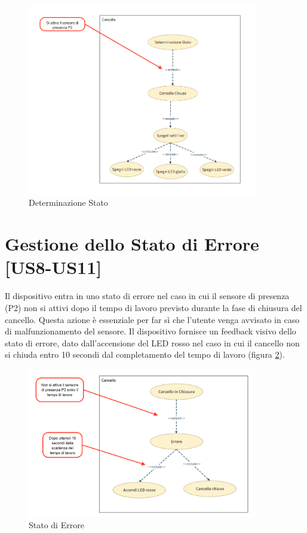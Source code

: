 \begin{figure}[H]
    \centering
    \includegraphics[width=0.9\textwidth]{figures/usecase_7.png}
    \caption{Determinazione Stato}
    \label{usecase7}
\end{figure}


\section{Gestione dello Stato di Errore [US8-US11]}
Il dispositivo entra in uno stato di errore nel caso in cui il sensore di presenza (P2) non si attivi dopo il tempo di lavoro previsto durante la fase di chiusura del cancello.
Questa azione è essenziale per far sì che l'utente venga avvisato in caso di malfunzionamento del sensore.
Il dispositivo fornisce un feedback visivo dello stato di errore, dato dall'accensione del LED rosso nel caso in cui il cancello non si chiuda entro 10 secondi dal completamento del tempo di lavoro (figura \ref{usecase8}).

\begin{figure}[H]
    \centering
    \includegraphics[width=0.9\textwidth]{figures/usecase_8.png}
    \caption{Stato di Errore}
    \label{usecase8}
\end{figure}



